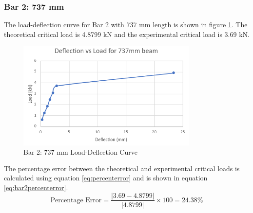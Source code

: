 \documentclass[12pt, titlepage]{article}
\begin{document}
\subsubsection{Bar 2: 737 mm}
The load-deflection curve for Bar 2 with 737 mm length is shown in figure
\ref{fig:bar2loaddefl}. The theoretical critical load is 4.8799 kN and the
experimental critical load is 3.69 kN.
\begin{figure}[H]
    \centering
    \includegraphics[width=0.8\textwidth]{./Images/d737.png}
    \caption{Bar 2: 737 mm Load-Deflection Curve}
    \label{fig:bar2loaddefl}
\end{figure}
The percentage error between the theoretical and experimental critical loads
is calculated using equation \ref{eq:percenterror} and is shown in equation
\ref{eq:bar2percenterror}.
\begin{equation}
    \label{eq:bar2percenterror}
    \text{Percentage Error} = \frac{\left| 3.69 - 4.8799\right|}{\left|4.8799\right|} \times 100 = 24.38\%
\end{equation}
\end{document}
